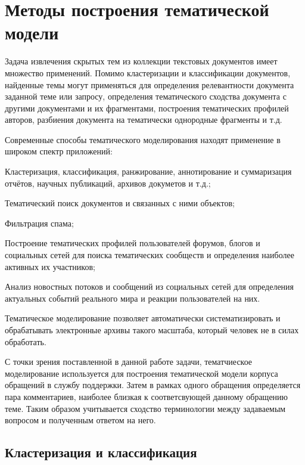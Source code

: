 \section{Методы построения тематической модели}
\label{sec:tm_techniques}

Задача извлечения скрытых тем из коллекции текстовых документов имеет множество применений. Помимо кластеризации и классификации документов, найденные темы могут применяться для определения релевантности документа заданной теме или запросу, определения тематического сходства документа с другими документами и их фрагментами, построения тематических профилей авторов, разбиения документа на тематически однородные фрагменты и т.д. 

Современные способы тематического моделирования находят применение в широком спектр приложений: 

\begin{itemize*}
\item Кластеризация, классификация, ранжирование, аннотирование и суммаризация отчётов, научных публикаций, архивов докуметов и т.д.; 
\item Тематический поиск документов и связанных с ними объектов;
\item Фильтрация спама; 
\item Построение тематических профилей пользователей форумов, блогов и социальных сетей для поиска тематических сообществ и определения наиболее активных их участников; 
\item Анализ новостных потоков и сообщений из социальных сетей для определения актуальных событий реального мира и реакции пользователей на них.
\end{itemize*}

Тематическое моделирование позволяет автоматически систематизировать и обрабатывать электронные архивы такого масштаба, который человек не в силах обработать.

С точки зрения поставленной в данной работе задачи, тематчиеское моделирование используется для построения тематической модели корпуса обращений в службу поддержки. Затем в рамках одного обращения определяется пара комментариев, наиболее близкая к соответсвующей данному обращению теме. Таким образом учитывается сходство терминологии между задаваемым вопросом и полученным ответом на него.

\subsection{Кластеризация и классификация}
